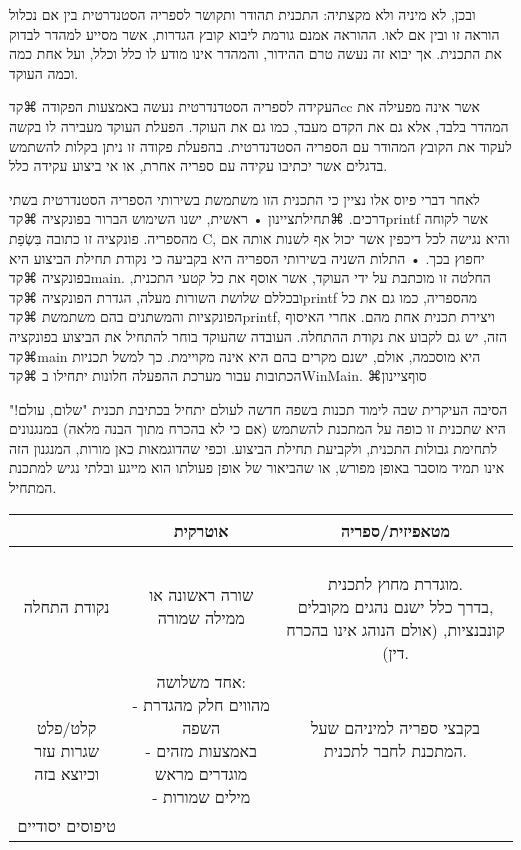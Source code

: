 {ובכן, לא מיניה ולא מקצתיה: התכנית תהודר ותקושר לספריה הסטנדרטית בין אם נכלול הוראה זו ובין אם לאו. ההוראה אמנם גורמת ליבוא קובץ הגדרות, אשר מסייע למהדר לבדוק את התכנית. אך יבוא זה נעשה טרם ההידור, והמהדר אינו מודע לו כלל וכלל, ועל אחת כמה וכמה העוקד.
 
העקידה לספריה הסטדנדרטית נעשה באמצעות הפקודה ⌘קד{cc} אשר אינה מפעילה את המהדר בלבד, אלא גם את הקדם מעבד, כמו גם את העוקד. הפעלת העוקד מעבירה לו בקשה לעקוד את הקובץ המהודר עם הספריה הסטדנדרטית. בהפעלת פקודה זו ניתן בקלות להשתמש בדגלים אשר יכתיבו עקידה עם ספריה אחרת, או אי ביצוע עקידה כלל. 

לאחר דברי פיוס אלו נציין כי התכנית הזו משתמשת בשירותי הספריה הסטנדרטית בשתי דרכים. 
⌘תחילת{ציינון}
• ראשית, ישנו השימוש הברור בפונקציה ⌘קד{printf} אשר לקוחה מהספריה. פונקציה זו כתובה בִּשְׂפַת C, והיא נגישה לכל דיכפין אשר יכול אף לשנות אותה אם יחפוץ בכך. 
• התלות השניה בשירותי הספריה היא בקביעה כי נקודת תחילת הביצוע היא בפונקציה ⌘קד{main}. החלטה זו מוכתבת על ידי העוקד, אשר אוסף את כל קטעי התכנית, ובכללם שלושת השורות מעלה, הגדרת הפונקציה ⌘קד{printf} מהספריה, כמו גם את כל הפונקציות והמשתנים בהם משתמשת ⌘קד{printf}, ויצירת תכנית אחת מהם. אחרי האיסוף הזה, יש גם לקבוע את נקודת ההתחלה.
העובדה שהעוקד בוחר להתחיל את הביצוע בפונקציה ⌘קד{main} היא מוסכמה, אולם, ישנם מקרים בהם היא אינה מקויימת. כך למשל תכניות הכתובות עבור מערכת ההפעלה חלונות יתחילו ב ⌘קד{WinMain}. 
⌘סוף{ציינון}

הסיבה העיקרית שבה לימוד תכנות בשפה חדשה לעולם יתחיל בכתיבת תכנית "שלום, עולם!" היא שתכנית זו כופה על המתכנת להשתמש (אם כי לא בהכרח מתוך הבנה מלאה) במנגנונים לתחימת גבולות התכנית, ולקביעת תחילת הביצוע. וכפי שהדוגמאות כאן מורות, המנגנון הזה אינו תמיד מוסבר באופן מפורש, או שהביאור של אופן פעולתו הוא מייגע ובלתי נגיש למתכנת המתחיל.


\bgroup
\def\arraystretch{2}
\begin{tabular}{|c|c|c|}
\hline 
 &
 אוטרקית
 &
 מטאפיזית/ספריה
\tabularnewline
\hline 
\hline 
נקודת התחלה & 
שורה ראשונה או ממילה שמורה &
\pbox{40cm}{
\leavevmode
\newline
מוגדרת מחוץ לתכנית.
\\
בדרך כלל ישנם נהגים מקובלים,\\ קונבנציות, (אולם הנוהג אינו בהכרח דין).
}
\tabularnewline
\hline 
\pbox{10cm}{
\leavevmode
\newline
קלט/פלט\\
שגרות עזר וכיוצא בזה
}

 &
 אחד משלושה:
\pbox{10cm}{
\leavevmode
\newline
- מהווים חלק מהגדרת השפה
\\
- באמצעות מזהים מוגדרים מראש
\\
- מילים שמורות
\\
}
& 
בקבצי ספריה למיניהם שעל המתכנת לחבר לתכנית.
\tabularnewline
\hline 
טיפוסים יסודיים & 



\end{tabular}}
